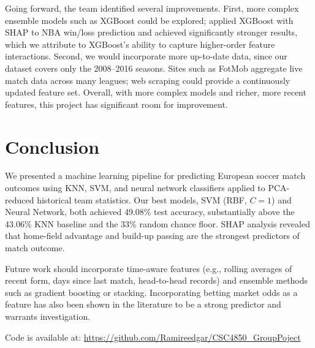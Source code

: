 \documentclass[conference]{IEEEtran}
\begin{document}
Going forward, the team identified several improvements. First, more complex ensemble models such as XGBoost could be explored; \cite{xgboost} applied XGBoost with SHAP to NBA win/loss prediction and achieved significantly stronger results, which we attribute to XGBoost's ability to capture higher-order feature interactions. Second, we would incorporate more up-to-date data, since our dataset covers only the 2008--2016 seasons. Sites such as FotMob \cite{fotmob} aggregate live match data across many leagues; web scraping could provide a continuously updated feature set. Overall, with more complex models and richer, more recent features, this project has significant room for improvement.

\section{Conclusion}

We presented a machine learning pipeline for predicting European soccer match outcomes using KNN, SVM, and neural network classifiers applied to PCA-reduced historical team statistics. Our best models, SVM (RBF, $C=1$) and Neural Network, both achieved 49.08\% test accuracy, substantially above the 43.06\% KNN baseline and the 33\% random chance floor. SHAP analysis revealed that home-field advantage and build-up passing are the strongest predictors of match outcome.

Future work should incorporate time-aware features (e.g., rolling averages of recent form, days since last match, head-to-head records) and ensemble methods such as gradient boosting or stacking. Incorporating betting market odds as a feature has also been shown in the literature to be a strong predictor \cite{tax2015} and warrants investigation.

Code is available at: \url{https://github.com/Ramireedgar/CSC4850_GroupPoject}
\end{document}
